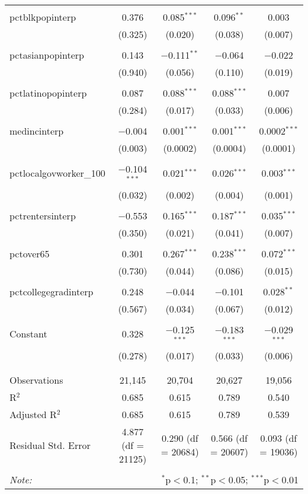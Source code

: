 \documentclass[]{article}
\begin{document}
\begin{table}[!htbp]
\begin{tabular}{@{\extracolsep{5pt}}lcccc}
  & & & & \\ 
 pctblkpopinterp & 0.376 & 0.085$^{***}$ & 0.096$^{**}$ & 0.003 \\ 
  & (0.325) & (0.020) & (0.038) & (0.007) \\ 
  & & & & \\ 
 pctasianpopinterp & 0.143 & $-$0.111$^{**}$ & $-$0.064 & $-$0.022 \\ 
  & (0.940) & (0.056) & (0.110) & (0.019) \\ 
  & & & & \\ 
 pctlatinopopinterp & 0.087 & 0.088$^{***}$ & 0.088$^{***}$ & 0.007 \\ 
  & (0.284) & (0.017) & (0.033) & (0.006) \\ 
  & & & & \\ 
 medincinterp & $-$0.004 & 0.001$^{***}$ & 0.001$^{***}$ & 0.0002$^{***}$ \\ 
  & (0.003) & (0.0002) & (0.0004) & (0.0001) \\ 
  & & & & \\ 
 pctlocalgovworker\_100 & $-$0.104$^{***}$ & 0.021$^{***}$ & 0.026$^{***}$ & 0.003$^{***}$ \\ 
  & (0.032) & (0.002) & (0.004) & (0.001) \\ 
  & & & & \\ 
 pctrentersinterp & $-$0.553 & 0.165$^{***}$ & 0.187$^{***}$ & 0.035$^{***}$ \\ 
  & (0.350) & (0.021) & (0.041) & (0.007) \\ 
  & & & & \\ 
 pctover65 & 0.301 & 0.267$^{***}$ & 0.238$^{***}$ & 0.072$^{***}$ \\ 
  & (0.730) & (0.044) & (0.086) & (0.015) \\ 
  & & & & \\ 
 pctcollegegradinterp & 0.248 & $-$0.044 & $-$0.101 & 0.028$^{**}$ \\ 
  & (0.567) & (0.034) & (0.067) & (0.012) \\ 
  & & & & \\ 
 Constant & 0.328 & $-$0.125$^{***}$ & $-$0.183$^{***}$ & $-$0.029$^{***}$ \\ 
  & (0.278) & (0.017) & (0.033) & (0.006) \\ 
  & & & & \\ 
\hline \\[-1.8ex] 
Observations & 21,145 & 20,704 & 20,627 & 19,056 \\ 
R$^{2}$ & 0.685 & 0.615 & 0.789 & 0.540 \\ 
Adjusted R$^{2}$ & 0.685 & 0.615 & 0.789 & 0.539 \\ 
Residual Std. Error & 4.877 (df = 21125) & 0.290 (df = 20684) & 0.566 (df = 20607) & 0.093 (df = 19036) \\ 
\hline 
\hline \\[-1.8ex] 
\textit{Note:}  & \multicolumn{4}{r}{$^{*}$p$<$0.1; $^{**}$p$<$0.05; $^{***}$p$<$0.01} \\ 
\end{tabular} 
\end{table}
\end{document}
